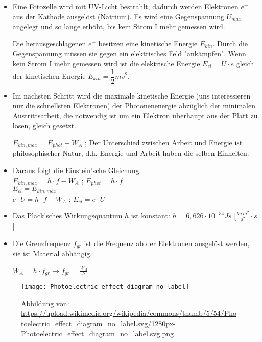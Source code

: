 \begin{itemize}
\item Eine Fotozelle wird mit UV-Licht bestrahlt, dadurch werden Elektronen $e^-$ aus der Kathode ausgelöst (Natrium). Es wird eine Gegenspannung $U_{max}$ angelegt und so lange erhöht, bis kein Strom I mehr gemessen wird.

Die herausgeschlagenen $e^-$ besitzen eine kinetische Energie $E_{kin}$. Durch die Gegenspannung müssen sie gegen ein elektrisches Feld "ankämpfen". Wenn kein Strom I mehr gemessen wird ist die elektrische Energie $E_{el} = U \cdot e$ gleich der kinetischen Energie $E_{kin} = \dfrac{1}{2} m v^2$.
\item Im nächsten Schritt wird die maximale kinetische Energie (uns interessieren nur die schnellsten Elektronen) der Photonenenergie abzüglich der minimalen Austrittsarbeit, die notwendig ist um ein Elektron überhaupt aus der Platt zu lösen, gleich gesetzt.

$E_{kin,max} = E_{phot} - W_A$ ; Der Unterschied zwischen Arbeit und Energie ist philosophischer Natur, d.h. Energie und Arbeit haben die selben Einheiten.
\item Daraus folgt die Einstein'sche Gleichung: \\ 
$E_{kin,max} = h \cdot f - W_A$  ; $E_{phot} = h \cdot f$ \\
$E_{el} = E_{kin,max}$ \\
$e \cdot U = h \cdot f - W_A$  ; $E_{el} = e \cdot U$
\item Das Plack'sches Wirkungsquantum $h$ ist konstant: $h = 6,626\cdot10^{-34} Js$ [$\frac{kg \ m^2}{s^2} \cdot s$]
\item Die Grenzfrequenz $f_{gr}$ ist die Frequenz ab der Elektronen ausgelöst werden, sie ist Material abhängig.

$W_A = h \cdot f_{gr} \rightarrow f_{gr} = \frac{W_A}{h}$
\end{itemize}

\begin{figure}[h!]
\centering \texttt{[image: Photoelectric\_effect\_diagram\_no\_label]}
\caption{Abbildung von: \url{https://upload.wikimedia.org/wikipedia/commons/thumb/5/54/Photoelectric\_effect\_diagram\_no\_label.svg/1280px-Photoelectric\_effect\_diagram\_no\_label.svg.png}}
\end{figure}
